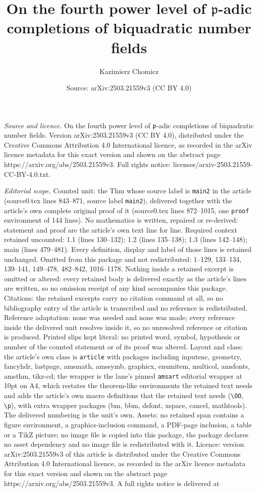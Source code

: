 \documentclass[10pt,a4paper]{amsart}
\title[On the fourth power level of $\mathfrak{p}$-adic completions]{On the fourth power level of $\mathfrak{p}$-adic completions of biquadratic number fields}
\author{Kazimierz Chomicz}
\date{Source: arXiv:2503.21559v3 (CC BY 4.0)}
\begin{document}
\maketitle

\noindent\emph{Source and licence.} On the fourth power level of $\mathfrak{p}$-adic completions of biquadratic number fields. Version arXiv:2503.21559v3 (CC BY 4.0), distributed under the Creative Commons Attribution 4.0 International licence, as recorded in the arXiv licence metadata for this exact version and shown on the abstract page https://arxiv.org/abs/2503.21559v3. Full rights notice: licenses/arxiv-2503.21559-CC-BY-4.0.txt.\par\smallskip

\noindent\textit{Editorial scope.} Counted unit: the Thm whose source label is \texttt{main2} in the article (source0.tex lines 843--871, source label \texttt{main2}), delivered together with the article's own complete original proof of it (source0.tex lines 872--1015, one \texttt{proof} environment of 144 lines). No mathematics is written, repaired or re-derived: statement and proof are the article's own text line for line. Required context retained uncounted: 1.1 (lines 130--132); 1.2 (lines 135--138); 1.3 (lines 142--148); main (lines 479--481). Every definition, display and label of those lines is retained unchanged. Omitted from this package and not redistributed: 1--129, 133--134, 139--141, 149--478, 482--842, 1016--1178. Nothing inside a retained excerpt is omitted or altered: every retained body is delivered exactly as the article's lines are written, so no omission receipt of any kind accompanies this package. Citations: the retained excerpts carry no citation command at all, so no bibliography entry of the article is transcribed and no reference is redistributed. Reference adaptation: none was needed and none was made; every reference inside the delivered unit resolves inside it, so no unresolved reference or citation is produced. Printed slips kept literal: no printed word, symbol, hypothesis or number of the counted statement or of its proof was altered. Layout and class: the article's own class is \texttt{article} with packages including inputenc, geometry, fancyhdr, lastpage, amsmath, amssymb, graphicx, enumitem, multicol, amsfonts, amsthm, tikz-cd; the wrapper is the lane's pinned \texttt{amsart} editorial wrapper at 10pt on A4, which restates the theorem-like environments the retained text needs and adds the article's own macro definitions that the retained text needs (\texttt{\textbackslash OO}, \texttt{\textbackslash p}), with extra wrapper packages (bm, bbm, dsfont, xspace, cancel, mathtools). The delivered numbering is the unit's own. Assets: no retained span contains a figure environment, a graphics-inclusion command, a PDF-page inclusion, a table or a TikZ picture; no image file is copied into this package, the package declares no asset dependency and no image file is redistributed with it. Licence: version arXiv:2503.21559v3 of this article is distributed under the Creative Commons Attribution 4.0 International licence, as recorded in the arXiv licence metadata for this exact version and shown on the abstract page https://arxiv.org/abs/2503.21559v3. A full rights notice is delivered at 
\end{document}
